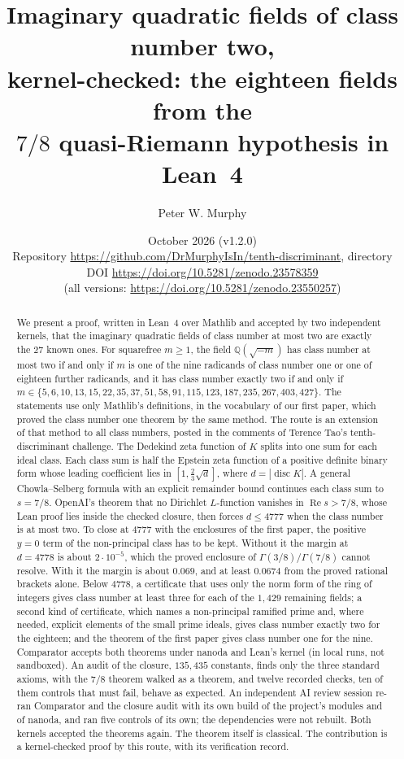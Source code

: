 \documentclass[11pt]{article}
\title{Imaginary quadratic fields of class number two,\\ kernel-checked: the eighteen fields from the\\ $7/8$ quasi-Riemann hypothesis in Lean~4}
\author{Peter W. Murphy}
\date{October 2026 (v1.2.0)\\[2pt] \small Repository \url{https://github.com/DrMurphyIsIn/tenth-discriminant}, directory \lean{hcn/}\\ \small DOI \url{https://doi.org/10.5281/zenodo.23578359}\\ \small (all versions: \url{https://doi.org/10.5281/zenodo.23550257})}
\theoremstyle{definition}
\newcommand{\re}{\operatorname{Re}}
\newcommand{\Q}{\mathbb{Q}}
\newcommand{\disc}{\operatorname{disc}}
\begin{document}
\maketitle

\begin{abstract}
We present a proof, written in Lean~4 over Mathlib and accepted by two independent kernels, that the imaginary quadratic fields of class number at most two are exactly the $27$ known ones. For squarefree $m \ge 1$, the field $\Q(\sqrt{-m})$ has class number at most two if and only if $m$ is one of the nine radicands of class number one or one of eighteen further radicands, and it has class number exactly two if and only if $m \in \{5, 6, 10, 13, 15, 22, 35, 37, 51, 58, 91, 115, 123, 187, 235, 267, 403, 427\}$. The statements use only Mathlib's definitions, in the vocabulary of our first paper, which proved the class number one theorem by the same method. The route is an extension of that method to all class numbers, posted in the comments of Terence Tao's tenth-discriminant challenge. The Dedekind zeta function of $K$ splits into one sum for each ideal class. Each class sum is half the Epstein zeta function of a positive definite binary form whose leading coefficient lies in $[1, \frac23\sqrt d]$, where $d = |\disc K|$. A general Chowla--Selberg formula with an explicit remainder bound continues each class sum to $s = 7/8$. OpenAI's theorem that no Dirichlet $L$-function vanishes in $\re s > 7/8$, whose Lean proof lies inside the checked closure, then forces $d \le 4777$ when the class number is at most two. To close at $4777$ with the enclosures of the first paper, the positive $y = 0$ term of the non-principal class has to be kept. Without it the margin at $d = 4778$ is about $2\cdot 10^{-5}$, which the proved enclosure of $\Gamma(3/8)/\Gamma(7/8)$ cannot resolve. With it the margin is about $0.069$, and at least $0.0674$ from the proved rational brackets alone. Below $4778$, a certificate that uses only the norm form of the ring of integers gives class number at least three for each of the $1{,}429$ remaining fields; a second kind of certificate, which names a non-principal ramified prime and, where needed, explicit elements of the small prime ideals, gives class number exactly two for the eighteen; and the theorem of the first paper gives class number one for the nine. Comparator accepts both theorems under nanoda and Lean's kernel (in local runs, not sandboxed). An audit of the closure, $135{,}435$ constants, finds only the three standard axioms, with the $7/8$ theorem walked as a theorem, and twelve recorded checks, ten of them controls that must fail, behave as expected. An independent AI review session re-ran Comparator and the closure audit with its own build of the project's modules and of nanoda, and ran five controls of its own; the dependencies were not rebuilt. Both kernels accepted the theorems again. The theorem itself is classical. The contribution is a kernel-checked proof by this route, with its verification record.
\end{abstract}
\end{document}
